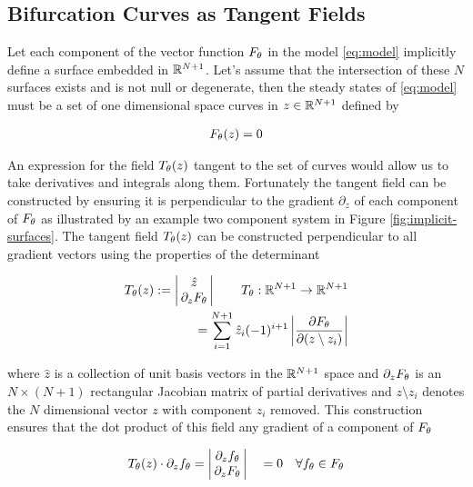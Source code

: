 \subsection{Bifurcation Curves as Tangent Fields}
\label{section:tangent-fields}

Let each component of the vector function $F_{\theta}$ in the model \eqref{eq:model} implicitly define a surface embedded in $\mathbb{R}^{N+1}$. Let's assume that the intersection of these $N$ surfaces exists and is not null or degenerate, then the steady states of \eqref{eq:model} must be a set of one dimensional space curves in $z\in\mathbb{R}^{N+1}$ defined by

\begin{align}
    F_{\theta}(z) = 0
\end{align}

An expression for the field $T_{\theta}(z)$ tangent to the set of curves would allow us to take derivatives and integrals along them. Fortunately the tangent field can be constructed by ensuring it is perpendicular to the gradient $\partial_z$ of each component of $F_{\theta}$ as illustrated by an example two component system in Figure \ref{fig:implicit-surfaces}. The tangent field $T_{\theta}(z)$ can be constructed perpendicular to all gradient vectors using the properties of the determinant \cite{Goldman2005CurvatureSurfaces}

\begin{align}
    T_{\theta}(z):=
    \label{eq:tangent-field}
    \left|\begin{matrix}
        \hat{z} \\
        \,\partial_{z}F_{\theta}\,
    \end{matrix}\right|
    \qquad T_{\theta} : \mathbb{R}^{N+1}\rightarrow\mathbb{R}^{N+1}\\
    =\sum_{i=1}^{N+1}\hat{z}_{i}(-1)^{i+1} \left|\frac{\partial F_{\theta}}{\partial(z\setminus z_{i}) }\right|
\end{align}

where $\hat{z}$ is a collection of unit basis vectors in the $\mathbb{R}^{N+1}$ space and $\partial_{z}F_{\theta}$ is an $N\times(N+1)$ rectangular Jacobian matrix of partial derivatives and $z\setminus z_{i}$ denotes the $N$ dimensional vector $z$ with component $z_{i}$ removed. This construction ensures that the dot product of this field any gradient of a component of $F_{\theta}$

\begin{align}
    T_{\theta}(z)\cdot\partial_z f_{\theta} =
    \left|\begin{matrix}
        \partial_z f_{\theta} \\
        \,\partial_{z}F_{\theta}\,
    \end{matrix}\right|
    \quad =0 \quad\forall f_{\theta}\in F_{\theta}
\end{align}

